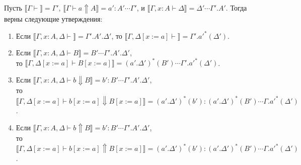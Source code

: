 \documentclass{amsart}
\theoremstyle{definition}
\theoremstyle{remark}
\renewcommand{\ll}{\llbracket}
\newcommand{\rr}{\rrbracket}
\numberwithin{figure}{section}
\begin{document}
\begin{lem}
Пусть $\ll \Gamma \vdash \rr = \Gamma'$, $\ll \Gamma \vdash a \Uparrow A \rr = a' : A' \dotsb \Gamma'$, и $\ll \Gamma, x : A \vdash \Delta \rr = \Delta' \dotsb \Gamma'.A'$.
Тогда верны следующие утверждения:
\begin{enumerate}
\item Если $\ll \Gamma, x : A, \Delta \vdash \rr = \Gamma'.A'.\Delta'$, то $\ll \Gamma, \Delta[x := a] \vdash \rr = \Gamma'.a'^*(\Delta')$.
\item Если $\ll \Gamma, x : A, \Delta \vdash B \rr = B' \dotsb \Gamma'.A'.\Delta'$, \\
    то $\ll \Gamma, \Delta[x := a] \vdash B[x := a] \rr = (a'.\Delta')^*(B') \dotsb \Gamma'.a'^*(\Delta')$.
\item Если $\ll \Gamma, x : A, \Delta \vdash b \Downarrow B \rr = b' : B' \dotsb \Gamma'.A'.\Delta'$, \\
    то $\ll \Gamma, \Delta[x := a] \vdash b[x := a] \Downarrow B[x := a] \rr = (a'.\Delta')^*(b') : (a'.\Delta')^*(B') \dotsb \Gamma.a'^*(\Delta')$.
\item Если $\ll \Gamma, x : A, \Delta \vdash b \Uparrow B \rr = b' : B' \dotsb \Gamma'.A'.\Delta'$, \\
    то $\ll \Gamma, \Delta[x := a] \vdash b[x := a] \Uparrow B[x := a] \rr = (a'.\Delta')^*(b') : (a'.\Delta')^*(B') \dotsb \Gamma.a'^*(\Delta')$.
\end{enumerate}
\end{lem}
\end{document}
